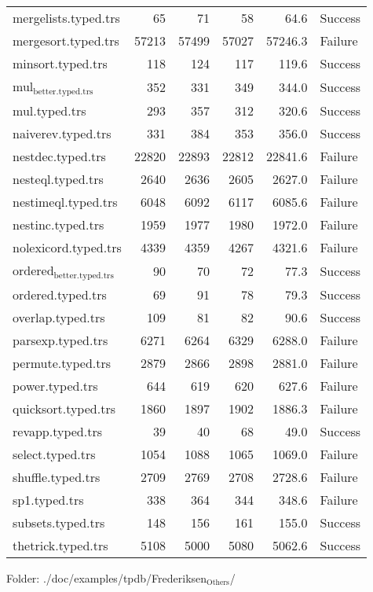 \documentclass[11pt]{article}
\begin{document}
\begin{center}
\begin{tabular}{lrrrrl}
mergelists.typed.trs & 65 & 71 & 58 & 64.6 & Success\\
mergesort.typed.trs & 57213 & 57499 & 57027 & 57246.3 & Failure\\
minsort.typed.trs & 118 & 124 & 117 & 119.6 & Success\\
mul\(_{\text{better.typed.trs}}\) & 352 & 331 & 349 & 344.0 & Success\\
mul.typed.trs & 293 & 357 & 312 & 320.6 & Success\\
naiverev.typed.trs & 331 & 384 & 353 & 356.0 & Success\\
nestdec.typed.trs & 22820 & 22893 & 22812 & 22841.6 & Failure\\
nesteql.typed.trs & 2640 & 2636 & 2605 & 2627.0 & Failure\\
nestimeql.typed.trs & 6048 & 6092 & 6117 & 6085.6 & Failure\\
nestinc.typed.trs & 1959 & 1977 & 1980 & 1972.0 & Failure\\
nolexicord.typed.trs & 4339 & 4359 & 4267 & 4321.6 & Failure\\
ordered\(_{\text{better.typed.trs}}\) & 90 & 70 & 72 & 77.3 & Success\\
ordered.typed.trs & 69 & 91 & 78 & 79.3 & Success\\
overlap.typed.trs & 109 & 81 & 82 & 90.6 & Success\\
parsexp.typed.trs & 6271 & 6264 & 6329 & 6288.0 & Failure\\
permute.typed.trs & 2879 & 2866 & 2898 & 2881.0 & Failure\\
power.typed.trs & 644 & 619 & 620 & 627.6 & Failure\\
quicksort.typed.trs & 1860 & 1897 & 1902 & 1886.3 & Failure\\
revapp.typed.trs & 39 & 40 & 68 & 49.0 & Success\\
select.typed.trs & 1054 & 1088 & 1065 & 1069.0 & Failure\\
shuffle.typed.trs & 2709 & 2769 & 2708 & 2728.6 & Failure\\
sp1.typed.trs & 338 & 364 & 344 & 348.6 & Failure\\
subsets.typed.trs & 148 & 156 & 161 & 155.0 & Success\\
thetrick.typed.trs & 5108 & 5000 & 5080 & 5062.6 & Success\\
\end{tabular}

\end{center}


Folder: ./doc/examples/tpdb/Frederiksen\(_{\text{Others}}\)/
\end{document}
